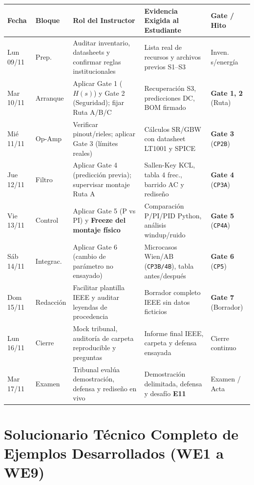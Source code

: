 \documentclass[11pt, a4paper]{article}
\begin{document}
\begin{center}
\begin{tabularx}{\textwidth}{@{} l l L L l @{}}
\toprule
\textbf{Fecha} & \textbf{Bloque} & \textbf{Rol del Instructor} & \textbf{Evidencia Exigida al Estudiante} & \textbf{Gate / Hito} \\ \midrule
Lun 09/11 & Prep. & Auditar inventario, datasheets y confirmar reglas institucionales & Lista real de recursos y archivos previos S1--S3 & Inven. s/energía \\ \addlinespace[3pt]
Mar 10/11 & Arranque & Aplicar Gate 1 ($H(s)$) y Gate 2 (Seguridad); fijar Ruta A/B/C & Recuperación S3, predicciones DC, BOM firmado & \textbf{Gate 1, 2} (Ruta) \\ \addlinespace[3pt]
Mié 11/11 & Op-Amp & Verificar pinout/rieles; aplicar Gate 3 (límites reales) & Cálculos SR/GBW con datasheet LT1001 y SPICE & \textbf{Gate 3} (\texttt{CP2B}) \\ \addlinespace[3pt]
Jue 12/11 & Filtro & Aplicar Gate 4 (predicción previa); supervisar montaje Ruta A & Sallen-Key KCL, tabla 4 frec., barrido AC y rediseño & \textbf{Gate 4} (\texttt{CP3A}) \\ \addlinespace[3pt]
Vie 13/11 & Control & Aplicar Gate 5 (P vs PI) y \textbf{Freeze del montaje físico} & Comparación P/PI/PID Python, análisis windup/ruido & \textbf{Gate 5} (\texttt{CP4A}) \\ \addlinespace[3pt]
Sáb 14/11 & Integrac. & Aplicar Gate 6 (cambio de parámetro no ensayado) & Microcasos Wien/AB (\texttt{CP3B/4B}), tabla antes/después & \textbf{Gate 6} (\texttt{CP5}) \\ \addlinespace[3pt]
Dom 15/11 & Redacción & Facilitar plantilla IEEE y auditar leyendas de procedencia & Borrador completo IEEE sin datos ficticios & \textbf{Gate 7} (Borrador) \\ \addlinespace[3pt]
Lun 16/11 & Cierre & Mock tribunal, auditoría de carpeta reproducible y preguntas & Informe final IEEE, carpeta y defensa ensayada & Cierre continuo \\ \addlinespace[3pt]
Mar 17/11 & Examen & Tribunal evalúa demostración, defensa y rediseño en vivo & Demostración delimitada, defensa y desafío \textbf{E11} & Examen / Acta \\ \bottomrule
\end{tabularx}
\end{center}

\section{Solucionario Técnico Completo de Ejemplos Desarrollados (WE1 a WE9)}
\end{document}
